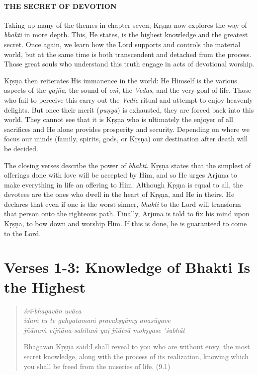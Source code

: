 \documentclass[12pt, twoside, openright]{memoir}
\begin{document}
\paragraph*{\MakeUppercase{The Secret of Devotion}}




\noindent Taking up many of the themes in chapter seven, Kṛṣṇa now explores the way of \textit{bhakti} in more depth. This, He states, is the highest knowledge and the greatest secret. Once again, we learn how the Lord supports and controls the material world, but at the same time is both transcendent and detached from the process. Those great souls who understand this truth engage in acts of devotional worship.

Kṛṣṇa then reiterates His immanence in the world: He Himself is the various aspects of the \textit{yajña}, the sound of \textit{oṁ}, the \textit{Vedas}, and the very goal of life. Those who fail to perceive this carry out the \textit{Vedic} ritual and attempt to enjoy heavenly delights. But once their merit (\textit{puṇya}) is exhausted, they are forced back into this world. They cannot see that it is Kṛṣṇa who is ultimately the enjoyer of all sacrifices and He alone provides prosperity and security. Depending on where we focus our minds (family, spirits, gods, or Kṛṣṇa) our destination after death will be decided.

The closing verses describe the power of \textit{bhakti}. Kṛṣṇa states that the simplest of offerings done with love will be accepted by Him, and so He urges Arjuna to make everything in life an offering to Him. Although Kṛṣṇa is equal to all, the devotees are the ones who dwell in the heart of Kṛṣṇa, and He in theirs. He declares that even if one is the worst sinner, \textit{bhakti} to the Lord will transform that person onto the righteous path. Finally, Arjuna is told to fix his mind upon Kṛṣṇa, to bow down and worship Him. If this is done, he is guaranteed to come to the Lord.

\section{Verses 1-3: Knowledge of Bhakti Is the Highest}\label{sec-verses-1-3-knowledge-of-bhakti-is-the-highest}


\par
\begin{verse}
\textit{śrī-bhagavān uvāca} \\
\textit{idaṁ tu te guhyatamaṁ pravakṣyāmy anasūyave} \\
\textit{jñānaṁ vijñāna-sahitaṁ yaj jñātvā mokṣyase ’śubhāt}

\noindent \quad Bhagavān Kṛṣṇa said:\linebreak I shall reveal to you who are without envy, the most secret knowledge, along with the process of its realization, knowing which you shall be freed from the miseries of life. (9.1)
\end{verse}
\par
\end{document}
